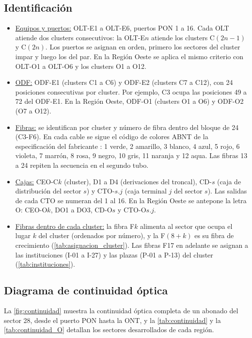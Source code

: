 \subsection{Identificación}
\begin{itemize}
    \item \underline{Equipos y puertos:} OLT-E1 a OLT-E6, puertos PON 1 a 16. Cada OLT atiende dos clusters consecutivos: la OLT-E$n$ atiende los clusters C$(2n-1)$ y C$(2n)$. Los puertos se asignan en orden, primero los sectores del cluster impar y luego los del par. En la Región Oeste se aplica el mismo criterio con OLT-O1 a OLT-O6 y los clusters O1 a O12.
    \item \underline{ODF:} ODF-E1 (clusters C1 a C6) y ODF-E2 (clusters C7 a C12), con 24 posiciones consecutivas por cluster. Por ejemplo, C3 ocupa las posiciones 49 a 72 del ODF-E1. En la Región Oeste, ODF-O1 (clusters O1 a O6) y ODF-O2 (O7 a O12).
    \item \underline{Fibras:} se identifican por cluster y número de fibra dentro del bloque de 24 (C3-F6). En cada cable se sigue el código de colores ABNT de la especificación del fabricante \cite{et_minira}: 1 verde, 2 amarillo, 3 blanco, 4 azul, 5 rojo, 6 violeta, 7 marrón, 8 rosa, 9 negro, 10 gris, 11 naranja y 12 aqua. Las fibras 13 a 24 repiten la secuencia en el segundo tubo.
    \item \underline{Cajas:} CEO-C$k$ (cluster), D1 a D4 (derivaciones del troncal), CD-$s$ (caja de distribución del sector $s$) y CTO-$s.j$ (caja terminal $j$ del sector $s$). Las salidas de cada CTO se numeran del 1 al 16. En la Región Oeste se antepone la letra O: CEO-O$k$, DO1 a DO3, CD-O$s$ y CTO-O$s.j$.
    \item \underline{Fibras dentro de cada cluster:} la fibra F$k$ alimenta al sector que ocupa el lugar $k$ del cluster (ordenados por número), y la F$(8+k)$ es su fibra de crecimiento (\autoref{tab:asignacion_cluster}). Las fibras F17 en adelante se asignan a las instituciones (I-01 a I-27) y las plazas (P-01 a P-13) del cluster (\autoref{tab:instituciones}).
\end{itemize}

\subsection{Diagrama de continuidad óptica}
La \autoref{fig:continuidad} muestra la continuidad óptica completa de un abonado del sector 28, desde el puerto PON hasta la ONT, y la \autoref{tab:continuidad} y la \autoref{tab:continuidad_O} detallan los sectores desarrollados de cada región.

